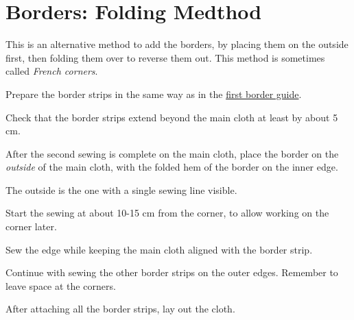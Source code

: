 \chapter{Borders: Folding Medthod}

This is an alternative method to add the borders, by placing them on the
outside first, then folding them over to reverse them out. This method
is sometimes called \emph{French corners}.

Prepare the border strips in the same way as in the
\href{/en/borders}{first border guide}.

Check that the border strips extend beyond the main cloth at least by
about 5 cm.

After the second sewing is complete on the main cloth, place the border
on the \emph{outside} of the main cloth, with the folded hem of the
border on the inner edge.

The outside is the one with a single sewing line visible.


Start the sewing at about 10-15 cm from the corner, to allow working on
the corner later.

\clearpage

Sew the edge while keeping the main cloth aligned with the border strip.

\begin{multicols}{2}
\setlength{\nextPhotoWidth}{\linewidth}


\columnbreak
\setlength{\nextPhotoWidth}{\linewidth}


\end{multicols}


Continue with sewing the other border strips on the outer edges.
Remember to leave space at the corners.


After attaching all the border strips, lay out the cloth.

\begin{multicols}{2}
\setlength{\nextPhotoWidth}{\linewidth}


\columnbreak
\setlength{\nextPhotoWidth}{\linewidth}


\end{multicols}

